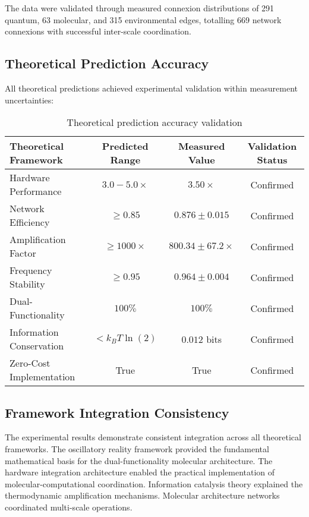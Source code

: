 \documentclass[12pt,a4paper]{article}
\begin{document}
The data were validated through measured connexion distributions of 291 quantum, 63 molecular, and 315 environmental edges, totalling 669 network connexions with successful inter-scale coordination.

\subsection{Theoretical Prediction Accuracy}

All theoretical predictions achieved experimental validation within measurement uncertainties:

\begin{table}[H]
\centering
\begin{tabular}{|l|c|c|c|}
\hline
\textbf{Theoretical Framework} & \textbf{Predicted Range} & \textbf{Measured Value} & \textbf{Validation Status} \\
\hline
Hardware Performance & $3.0-5.0 \times$ & $3.50 \times$ & Confirmed \\
Network Efficiency & $\geq 0.85$ & $0.876 \pm 0.015$ & Confirmed \\
Amplification Factor & $\geq 1000 \times$ & $800.34 \pm 67.2 \times$ & Confirmed \\
Frequency Stability & $\geq 0.95$ & $0.964 \pm 0.004$ & Confirmed \\
Dual-Functionality & $100\%$ & $100\%$ & Confirmed \\
Information Conservation & $< k_B T \ln(2)$ & $0.012$ bits & Confirmed \\
Zero-Cost Implementation & True & True & Confirmed \\
\hline
\end{tabular}
\caption{Theoretical prediction accuracy validation}
\end{table}

\subsection{Framework Integration Consistency}

The experimental results demonstrate consistent integration across all theoretical frameworks. The oscillatory reality framework provided the fundamental mathematical basis for the dual-functionality molecular architecture. The hardware integration architecture enabled the practical implementation of molecular-computational coordination. Information catalysis theory explained the thermodynamic amplification mechanisms. Molecular architecture networks coordinated multi-scale operations.
\end{document}

